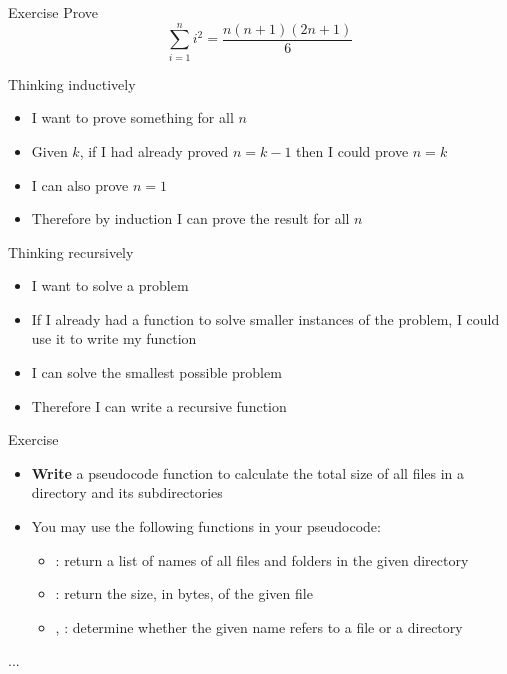 \begin{frame}{Exercise}
Prove
$$ \sum_{i=1}^n i^2 = \frac{n(n+1)(2n+1)}{6} $$
\end{frame}

\begin{frame}{Thinking inductively}
	\begin{itemize}
		\pause\item I want to prove something for all $n$
		\pause\item Given $k$, if I had already proved $n=k-1$ then I could prove $n=k$
		\pause\item I can also prove $n=1$
		\pause\item Therefore by induction I can prove the result for all $n$
	\end{itemize}
\end{frame}

\begin{frame}{Thinking recursively}
	\begin{itemize}
		\pause\item I want to solve a problem
		\pause\item If I already had a function to solve smaller instances of the problem, I could use it
			to write my function
		\pause\item I can solve the smallest possible problem
		\pause\item Therefore I can write a recursive function
	\end{itemize}
\end{frame}

\begin{frame}{Exercise}
	\begin{itemize}
		\item \textbf{Write} a pseudocode function to calculate the total size of all files in a directory and its subdirectories
		\item You may use the following functions in your pseudocode:
			\begin{itemize}
				\item {}: return a list of names of all files and folders in the given directory
				\item {}: return the size, in bytes, of the given file
				\item {}, : determine whether the given name refers to a file or a directory
			\end{itemize}
	\end{itemize}
	\begin{algorithmic}
			\State ... 
		\EndProcedure
	\end{algorithmic}
\end{frame}

